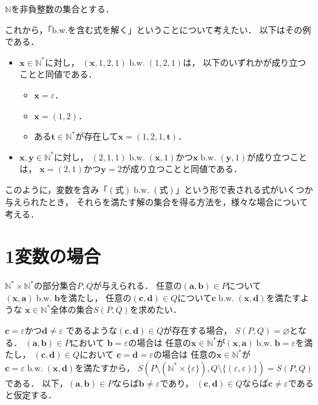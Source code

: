 \documentclass{ltjsarticle}
\newcommand\NN{\mathbb{N}}
\newcommand\bw{\mathrel{\text{b.w.}}}
\begin{document}
$\NN$を非負整数の集合とする．

これから，「b.w.を含む式を解く」ということについて考えたい．
以下はその例である．
\begin{itemize}
  \item $\boldsymbol{x} \in \NN^*$に対し，
    $(\boldsymbol{x}, 1, 2, 1) \bw (1, 2, 1)$は，
    以下のいずれかが成り立つことと同値である．
    \begin{itemize}
      \item $\boldsymbol{x} = \varepsilon$．
      \item $\boldsymbol{x} = (1, 2)$．
      \item ある$\boldsymbol{t} \in \NN^*$が存在して$\boldsymbol{x} = (1, 2, 1, \boldsymbol{t})$．
    \end{itemize}
  \item $\boldsymbol{x}, \boldsymbol{y} \in \NN^*$に対し，
    $(2, 1, 1) \bw (\boldsymbol{x}, 1)$かつ$\boldsymbol{x} \bw (\boldsymbol{y}, 1)$が成り立つことは，
    $\boldsymbol{x} = (2, 1)$かつ$\boldsymbol{y} = 2$が成り立つことと同値である．
\end{itemize}

このように，変数を含み「$(式) \bw (式)$」という形で表される式がいくつか与えられたとき，
それらを満たす解の集合を得る方法を，様々な場合について考える．
\section{1変数の場合}
$\NN^* \times \NN^*$の部分集合$P, Q$が与えられる．
任意の$(\boldsymbol{a}, \boldsymbol{b}) \in P$について$(\boldsymbol{x}, \boldsymbol{a}) \bw \boldsymbol{b}$を満たし，
任意の$(\boldsymbol{c}, \boldsymbol{d}) \in Q$について$\boldsymbol{c} \bw (\boldsymbol{x}, \boldsymbol{d})$を満たすような
$\boldsymbol{x} \in \NN^*$全体の集合$S(P, Q)$を求めたい．

$\boldsymbol{c} = \varepsilon$かつ$\boldsymbol{d} \ne \varepsilon$
であるような$(\boldsymbol{c}, \boldsymbol{d}) \in Q$が存在する場合，
$S(P, Q) = \varnothing$となる．
$(\boldsymbol{a}, \boldsymbol{b}) \in P$において
$\boldsymbol{b} = \varepsilon$の場合は
任意の$\boldsymbol{x} \in \NN^*$が$(\boldsymbol{x}, \boldsymbol{a}) \bw \boldsymbol{b} = \varepsilon$を満たし，
$(\boldsymbol{c}, \boldsymbol{d}) \in Q$において
$\boldsymbol{c} = \boldsymbol{d} = \varepsilon$の場合は
任意の$\boldsymbol{x} \in \NN^*$が$\boldsymbol{c} = \varepsilon \bw (\boldsymbol{x}, \boldsymbol{d})$を満たすから，
$S(P \setminus (\NN^* \times \{\varepsilon\}), Q \setminus \{(\varepsilon, \varepsilon)\}) = S(P, Q)$である．
以下，$(\boldsymbol{a}, \boldsymbol{b}) \in P$ならば$\boldsymbol{b} \ne \varepsilon$であり，
$(\boldsymbol{c}, \boldsymbol{d}) \in Q$ならば$\boldsymbol{c} \ne \varepsilon$であると仮定する．
\end{document}
